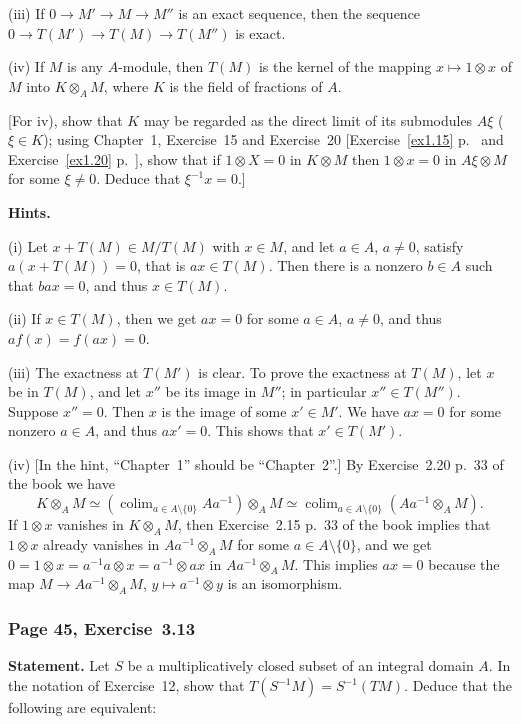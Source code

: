 \documentclass[12pt,letterpaper]{article}%
\DeclareMathOperator*{\colim}{colim}
\newcommand{\nn}{\noindent}
\begin{document}
\nn(iii) If $0\to M'\to M\to M''$ is an exact sequence, then the sequence $0\to T(M')\to T(M)\to T(M'')$ is exact.

\nn(iv) If $M$ is any $A$-module, then $T(M)$ is the kernel of the mapping $x\mapsto1 \otimes x$ of $M$ into $K\otimes_AM$, where $K$ is the field of fractions of $A$.

[For iv), show that $K$ may be regarded as the direct limit of its submodules $A\xi$ ($\xi\in K$); using Chapter~1, Exercise~15 and Exercise~20 [Exercise~\ref{ex1.15} p.~\pageref{ex1.15} and Exercise~\ref{ex1.20} p.~\pageref{ex1.20}], show that if $1\otimes X=0$ in $K\otimes M$ then $1\otimes x=0$ in $A\xi\otimes M$ for some $\xi\ne0$. Deduce that $\xi^{-1}x=0$.]

\nn\textbf{Hints.}

\nn(i) Let $x+T(M)\in M/T(M)$ with $x\in M$, and let $a\in A$, $a\ne0$, satisfy $a(x+T(M))=0$, that is $ax\in T(M)$. Then there is a nonzero $b\in A$ such that $bax=0$, and thus $x\in T(M)$.

\nn(ii) If $x\in T(M)$, then we get $ax=0$ for some $a\in A$, $a\ne0$, and thus $af(x)=f(ax)=0$.

\nn(iii) The exactness at $T(M')$ is clear. To prove the exactness at $T(M)$, let $x$ be in $T(M)$, and let $x''$ be its image in $M''$; in particular $x''\in T(M'')$. Suppose $x''=0$. Then $x$ is the image of some $x'\in M'$. We have $ax=0$ for some nonzero $a\in A$, and thus $ax'=0$. This shows that $x'\in T(M')$.

\nn(iv) [In the hint, ``Chapter~1'' should be ``Chapter~2''.] By Exercise~2.20 p.~33 of the book we have 
$$
K\otimes_AM\simeq\left(\colim_{a\in A\setminus\{0\}}Aa^{-1}\right)\otimes_AM\simeq\colim_{a\in A\setminus\{0\}}\left(Aa^{-1}\otimes_AM\right).
$$ 
If $1\otimes x$ vanishes in $K\otimes_AM$, then Exercise~2.15 p.~33 of the book implies that $1\otimes x$ already vanishes in $Aa^{-1}\otimes_AM$ for some $a\in A\setminus\{0\}$, and we get $0=1\otimes x=a^{-1}a\otimes x=a^{-1}\otimes ax$ in $Aa^{-1}\otimes_AM$. This implies $ax=0$ because the map $M\to Aa^{-1}\otimes_AM$, $y\mapsto a^{-1}\otimes y$ is an isomorphism.

\subsubsection{Page 45, Exercise~3.13}%

\textbf{Statement.} Let $S$ be a multiplicatively closed subset of an integral domain $A$. In the notation of Exercise~12, show that $T(S^{-1}M)=S^{-1}(TM)$. Deduce that the following are equivalent:
\end{document}
